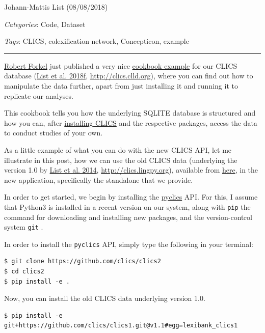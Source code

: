 \documentclass[
  a4paper,
  14pt,
  oneside,
  tablecaptionabove
]{scrbook}
\begin{document}
Johann-Mattis List (08/08/2018)

\emph{Categories}: Code, Dataset

\emph{Tags}: CLICS, colexification network, Concepticon, example

\begin{center}\rule{0.5\linewidth}{1pt}\end{center}

\href{https://github.com/xrotwang/}{Robert Forkel} just published a very
nice
\href{https://github.com/clics/clics2/tree/master/cookbook}{cookbook
example} for our CLICS database (\href{http://bibliography.lingpy.org?key=List2018f}{List et al. 2018f},
\url{http://clics.clld.org}), where you can find out how to manipulate
the data further, apart from just installing it and running it to
replicate our analyses.

This cookbook tells you how the underlying SQLITE database is structured
and how you can, after \href{https://github.com/clics/clics2}{installing
CLICS} and the respective packages, access the data to conduct studies
of your own.

As a little example of what you can do with the new CLICS API, let me
illustrate in this post, how we can use the old CLICS data (underlying
the version 1.0 by
\href{http://bibliography.lingpy.org?key=List2014f}{List et al. 2014},
\url{http://clics.lingpy.org}), available from
\href{https://github.com/clics/clics1}{here}, in the new application,
specifically the standalone that we provide.


In order to get started, we begin by installing the
\href{https://github.com/clics/clics2}{pyclics} API. For this, I assume
that Python3 is installed in a recent version on our system, along with
\lstinline!pip! the command for downloading and installing new packages,
and the version-control system \lstinline!git! .

In order to install the \lstinline!pyclics! API, simply type the
following in your terminal:

\begin{lstlisting}[basicstyle=\small]
$ git clone https://github.com/clics/clics2
$ cd clics2
$ pip install -e .
\end{lstlisting}

Now, you can install the old CLICS data underlying version 1.0.

\begin{lstlisting}[basicstyle=\small]
$ pip install -e git+https://github.com/clics/clics1.git@v1.1#egg=lexibank_clics1
\end{lstlisting}
\end{document}
